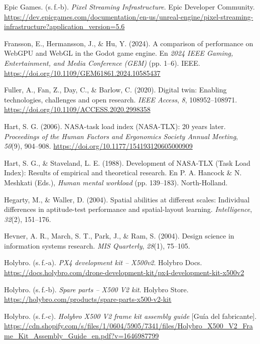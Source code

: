 \begin{list}{}
\item Epic Games. (s.\,f.-b). \textit{Pixel Streaming Infrastructure}. Epic Developer Community. \url{https://dev.epicgames.com/documentation/en-us/unreal-engine/pixel-streaming-infrastructure?application_version=5.6}

\item Fransson, E., Hermansson, J., \& Hu, Y. (2024). A comparison of performance on WebGPU and WebGL in the Godot game engine. En \textit{2024 IEEE Gaming, Entertainment, and Media Conference (GEM)} (pp. 1--6). IEEE. \url{https://doi.org/10.1109/GEM61861.2024.10585437}

\item Fuller, A., Fan, Z., Day, C., \& Barlow, C. (2020). Digital twin: Enabling technologies, challenges and open research. \textit{IEEE Access}, \textit{8}, 108952--108971. \url{https://doi.org/10.1109/ACCESS.2020.2998358}

\item Hart, S. G. (2006). NASA-task load index (NASA-TLX): 20 years later. \textit{Proceedings of the Human Factors and Ergonomics Society Annual Meeting}, \textit{50}(9), 904--908. \url{https://doi.org/10.1177/154193120605000909}

\item Hart, S. G., \& Staveland, L. E. (1988). Development of NASA-TLX (Task Load Index): Results of empirical and theoretical research. En P. A. Hancock \& N. Meshkati (Eds.), \textit{Human mental workload} (pp. 139--183). North-Holland.

\item Hegarty, M., \& Waller, D. (2004). Spatial abilities at different scales: Individual differences in aptitude-test performance and spatial-layout learning. \textit{Intelligence}, \textit{32}(2), 151--176.

\item Hevner, A. R., March, S. T., Park, J., \& Ram, S. (2004). Design science in information systems research. \textit{MIS Quarterly}, \textit{28}(1), 75--105.

\item Holybro. (s.\,f.-a). \textit{PX4 development kit -- X500v2}. Holybro Docs. \url{https://docs.holybro.com/drone-development-kit/px4-development-kit-x500v2}

\item Holybro. (s.\,f.-b). \textit{Spare parts -- X500 V2 kit}. Holybro Store. \url{https://holybro.com/products/spare-parts-x500-v2-kit}

\item Holybro. (s.\,f.-c). \textit{Holybro X500 V2 frame kit assembly guide} [Guía del fabricante]. \url{https://cdn.shopify.com/s/files/1/0604/5905/7341/files/Holybro_X500_V2_Frame_Kit_Assembly_Guide_en.pdf?v=1646987799}


\end{list}
